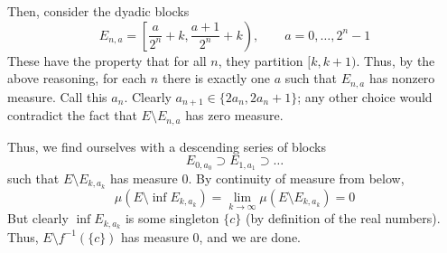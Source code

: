 \documentclass[11pt, headheight=30pt]{scrartcl}
\begin{document}
Then, consider the dyadic blocks
\[
    E_{n,a} = \left[\frac{a}{2^n} + k, \frac{a+1}{2^n} + k\right), \qquad a = 0, \dots, 2^n - 1
\]
These have the property that for all $n$, they partition $[k,k+1)$.
Thus, by the above reasoning, for each $n$ there is exactly one $a$
such that $E_{n,a}$ has nonzero measure. Call this $a_n$.
Clearly $a_{n+1} \in \{2a_n, 2a_n + 1\}$; any other choice would contradict
the fact that $E\setminus E_{n,a}$ has zero measure.

Thus, we find ourselves with a descending series of blocks
\[
    E_{0,a_0} \supset E_{1,a_1} \supset \dots    
\]
such that $E\setminus E_{k, a_k}$ has measure $0$. By
continuity of measure from below,
\[
    \mu\left(E\setminus \inf E_{k, a_k}\right) = \lim_{k\to \infty} \mu\left(E\setminus E_{k, a_k}\right) = 0   
\]
But clearly $\inf E_{k,a_k}$ is some singleton $\{c\}$ (by definition of the real numbers).
Thus, $E\setminus f^{-1}(\{c\})$ has measure $0$, and we are done.
\end{document}

